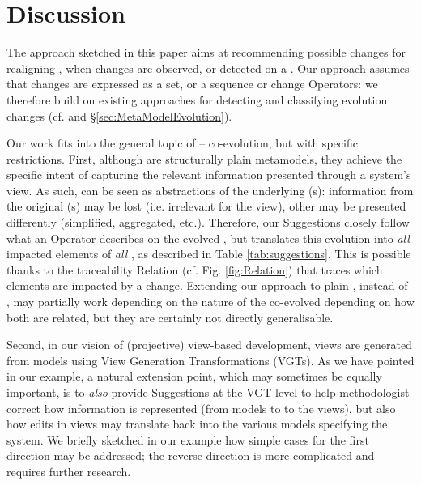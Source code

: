 \section{Discussion}
\label{sec:Discussion}

The approach sketched in this paper aims at recommending possible changes 
for realigning \viewtypes, when changes are observed, or detected on a 
\metamodel. Our approach assumes that \metamodel changes are expressed
as a set, or a sequence or change \textsf{Operator}s: we therefore build
on existing approaches for detecting and classifying evolution changes
(cf. \cite{herrmannsdoerfer_extensive_2011,khelladi_detecting_2015} and 
\S \ref{sec:MetaModelEvolution}).

Our work fits into the general topic of \metamodel{} -- \metamodel co-evolution,
but with specific restrictions. First, although \viewtypes are structurally 
plain metamodels, they achieve the specific intent of capturing the relevant
information presented through a system's view. As such, \viewtypes can
be seen as abstractions of the underlying \metamodel{}(s): information from
the original \metamodel{}(s) may be lost (i.e. irrelevant for the view), other
may be presented differently (simplified, aggregated, etc.). Therefore, our
\textsf{Suggestion}s closely follow what an \textsf{Operator} describes on
the evolved \metamodel, but translates this evolution into \emph{all} impacted
elements of \emph{all} \viewtypes, as described in Table \ref{tab:suggestions}.
This is possible thanks to the traceability \textsf{Relation} 
(cf. Fig. \ref{fig:Relation}) that traces which \viewtype elements are impacted
by a change.
Extending our approach to plain \metamodels, instead of \viewtypes, may partially
work depending on the nature of the co-evolved \metamodels depending on how
both \metamodels are related, but they are certainly not directly generalisable.

Second, in our vision of (projective) view-based development, views are generated
from models using View Generation Transformations (VGTs). As we have pointed in our
example, a natural extension point, which may sometimes be equally important,
is to \emph{also} provide \textsf{Suggestion}s at the VGT level to help 
methodologist correct how information is represented (from models to to the views),
but also how edits in views may translate back into the various models specifying
the system. We briefly sketched in our example how simple cases for the first 
direction may be addressed; the reverse direction is more complicated and requires
further research.

